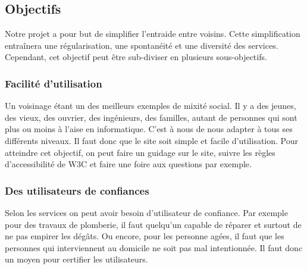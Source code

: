 \documentclass[a4paper,11pt]{article}
\begin{document}
\subsection{Objectifs}

Notre projet a pour but de simplifier l’entraide entre voisins. Cette simplification entraînera une
régularisation, une spontanéité et une diversité des services.\\

Cependant, cet objectif peut être sub-diviser en plusieurs sous-objectifs.\\





\subsubsection{Facilité d'utilisation}

Un voisinage étant un des meilleurs exemples de mixité social.
Il y a des jeunes, des vieux, des ouvrier, des ingénieurs, des familles, autant de personnes qui sont plus ou moins à l'aise en informatique.
C'est à nous de nous adapter à tous ses différents niveaux. Il faut donc que le site soit simple et facile d'utilisation.
Pour atteindre cet objectif, on peut faire un guidage sur le site, suivre les règles d'accessibilité de W3C et faire une foire aux questions par exemple.\\

\subsubsection{Des utilisateurs de confiances}

Selon les services on peut avoir besoin d'utilisateur de confiance.
Par exemple pour des travaux de plomberie, il faut quelqu'un capable de réparer et surtout de ne pas empirer les dégâts.
Ou encore, pour les personne agées, il faut que les personnes qui interviennent au domicile ne soit pas mal intentionnée.
Il faut donc un moyen pour certifier les utilisateurs.\\
\end{document}
